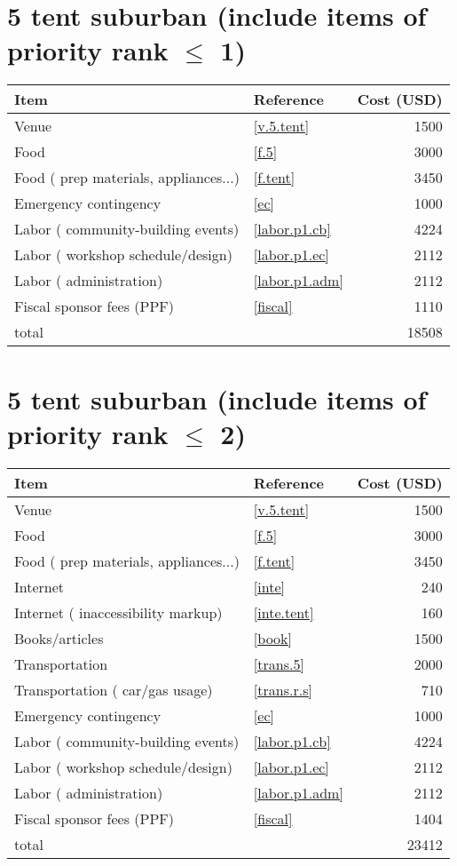\section*{5 tent suburban (include items of priority rank $\leq$ 1)}
\begin{center}
\begin{tabular}{llr}
Item & Reference & Cost (USD) \\ \hline
Venue & \ref{v.5.tent} & 1500 \\
Food & \ref{f.5} & 3000 \\
Food ( prep materials, appliances...) & \ref{f.tent} & 3450 \\
Emergency contingency & \ref{ec} & 1000 \\
Labor ( community-building events) & \ref{labor.p1.cb} & 4224 \\
Labor ( workshop schedule/design) & \ref{labor.p1.ec} & 2112 \\
Labor ( administration) & \ref{labor.p1.adm} & 2112 \\
Fiscal sponsor fees (PPF) & \ref{fiscal} & 1110 \\ \hline
total &  & 18508
\end{tabular}
\end{center}
\newpage
\section*{5 tent suburban (include items of priority rank $\leq$ 2)}
\begin{center}
\begin{tabular}{llr}
Item & Reference & Cost (USD) \\ \hline
Venue & \ref{v.5.tent} & 1500 \\
Food & \ref{f.5} & 3000 \\
Food ( prep materials, appliances...) & \ref{f.tent} & 3450 \\
Internet & \ref{inte} & 240 \\
Internet ( inaccessibility markup) & \ref{inte.tent} & 160 \\
Books/articles & \ref{book} & 1500 \\
Transportation & \ref{trans.5} & 2000 \\
Transportation ( car/gas usage) & \ref{trans.r.s} & 710 \\
Emergency contingency & \ref{ec} & 1000 \\
Labor ( community-building events) & \ref{labor.p1.cb} & 4224 \\
Labor ( workshop schedule/design) & \ref{labor.p1.ec} & 2112 \\
Labor ( administration) & \ref{labor.p1.adm} & 2112 \\
Fiscal sponsor fees (PPF) & \ref{fiscal} & 1404 \\ \hline
total &  & 23412
\end{tabular}
\end{center}
\newpage
